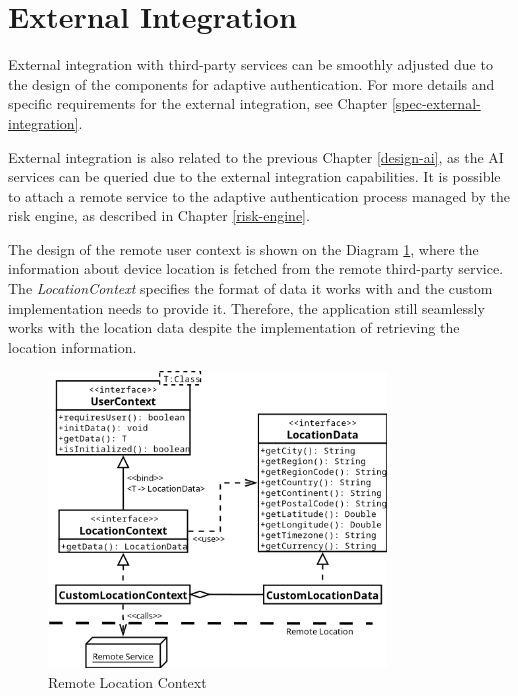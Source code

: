 \section{External Integration}
External integration with third-party services can be smoothly adjusted due to the design of the components for adaptive authentication.
For more details and specific requirements for the external integration, see Chapter \ref{spec-external-integration}.

External integration is also related to the previous Chapter \ref{design-ai}, as the AI services can be queried due to the external integration capabilities.
It is possible to attach a remote service to the adaptive authentication process managed by the risk engine, as described in Chapter \ref{risk-engine}.

The design of the remote user context is shown on the Diagram \ref{fig:design-external-integration}, where the information about device location is fetched from the remote third-party service. 
The \textit{LocationContext} specifies the format of data it works with and the custom implementation needs to provide it.
Therefore, the application still seamlessly works with the location data despite the implementation of retrieving the location information.

\begin{figure}[htbp]
  \centering
  \includegraphics[width=0.8\textwidth]{img/sections/5-design/location-diagram.png}
  \caption{Remote Location Context}
  \label{fig:design-external-integration}
\end{figure}

\newpage